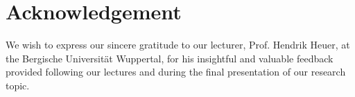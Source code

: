 \documentclass[manuscript,review]{acmart}
\begin{document}
\section{Acknowledgement}
We wish to express our sincere gratitude to our lecturer, Prof. Hendrik Heuer, at the Bergische Universität Wuppertal, for 
his insightful and valuable feedback provided following our lectures and during the final presentation of our research topic.



\end{document}
